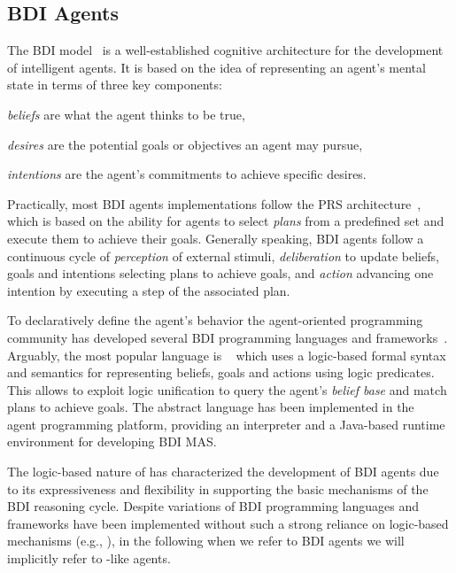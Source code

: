 \documentclass[
]{ceurart}
\begin{document}
\subsection{BDI Agents}

The \ac{BDI} model~\cite{DBLP:conf/atal/GeorgeffPPTW98}
is a well-established cognitive architecture for the development of intelligent agents.
%
It is based on the idea of representing an agent's mental state in terms of three key components:
\begin{inlinelist}
  \item \emph{beliefs} are what the agent thinks to be true,
  \item \emph{desires} are the potential goals or objectives an agent may pursue,
  \item \emph{intentions} are the agent's commitments to achieve specific desires.
\end{inlinelist}

Practically, most \ac{BDI} agents implementations follow the \ac{PRS} architecture~\cite{georgeff1986pieee},
which is based on the ability for agents to select \emph{plans} from a predefined set
and execute them to achieve their goals.
%
Generally speaking,
\ac{BDI} agents follow a continuous cycle of
\emph{perception} of external stimuli, 
\emph{deliberation} to update beliefs, goals and intentions selecting plans to achieve goals,
and \emph{action} advancing one intention by executing a step of the associated plan.

To declaratively define the agent's behavior the agent-oriented programming community has developed several \ac{BDI} programming languages and frameworks~\cite{DBLP:conf/woa/MascardiDA05}.
%
Arguably, the most popular language is \agentspeak{}~\cite{DBLP:conf/maamaw/Rao96} which 
uses a logic-based formal syntax and semantics for representing beliefs, goals and actions using logic predicates.
This allows to exploit logic unification to query the agent's \emph{belief base} and match plans to achieve goals.
The \agentspeak{} abstract language has been implemented in the \jason{}~\cite{bordini2007programming} agent programming platform, providing an interpreter and a Java-based runtime environment for developing \ac{BDI} \ac{MAS}.

The logic-based nature of \agentspeak{} has characterized the development of \ac{BDI} agents due to its expressiveness and flexibility in supporting the basic mechanisms of the \ac{BDI} reasoning cycle.
%
Despite variations of \ac{BDI} programming languages and frameworks have been implemented without such a strong reliance on logic-based mechanisms (e.g., \cite{map2005sp,kampik2019emas}), in the following when we refer to \ac{BDI} agents we will implicitly refer to \agentspeak{}-like agents.
\end{document}
